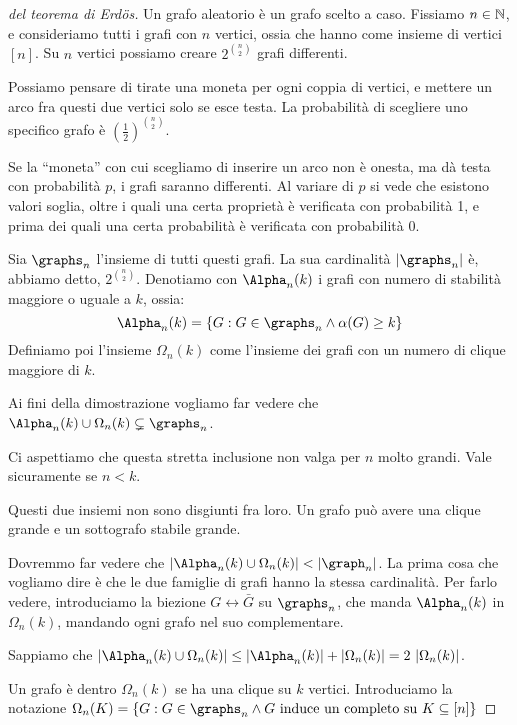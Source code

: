 	\begin{proof}[del teorema di Erd\"os]
		Un grafo aleatorio \`e un grafo scelto a caso.
		Fissiamo $n \in \mathbb{N}$, e consideriamo tutti i grafi con $n$ vertici, ossia che hanno come insieme di vertici $[n]$.
		Su $n$ vertici possiamo creare $2^{\binom{n}{2}}$ grafi differenti.

		Possiamo pensare di tirate una moneta per ogni coppia di vertici, e mettere un arco fra questi due vertici solo se esce testa.
		La probabilit\`a di scegliere uno specifico grafo \`e ${\left( \frac{1}{2} \right)}^{\binom{n}{2}}$.

		Se la ``moneta'' con cui scegliamo di inserire un arco non \`e onesta, ma d\`a testa con probabilit\`a $p$, i grafi saranno differenti.
		Al variare di $p$ si vede che esistono valori soglia, oltre i quali una certa propriet\`a \`e verificata con probabilit\`a 1, e prima dei quali una certa probabilit\`a \`e verificata con probabilit\`a 0.

		Sia $\graphs_n$ l'insieme di tutti questi grafi.
		La sua cardinalit\`a $\abs{\graphs_n}$ \`e, abbiamo detto, $2^{\binom{n}{2}}$.
		Denotiamo con $\Alpha_n(k)$ i grafi con numero di stabilit\`a maggiore o uguale a $k$, ossia:
		\[
			\Alpha_n(k) = \{ G : G \in \graphs_n \land \alpha(G) \ge k \}
		\]
		Definiamo poi l'insieme $\Omega_n (k)$ come l'insieme dei grafi con un numero di clique maggiore di $k$.

		Ai fini della dimostrazione vogliamo far vedere che $\Alpha_n (k) \cup \Omega_n (k) \subsetneq \graphs_n$.

		Ci aspettiamo che questa stretta inclusione non valga per $n$ molto grandi.
		Vale sicuramente se $n < k$. %

		Questi due insiemi non sono disgiunti fra loro.
		Un grafo pu\`o avere una clique grande e un sottografo stabile grande.

		Dovremmo far vedere che $\abs{\Alpha_n (k) \cup \Omega_n (k)} < \abs{\graph_n}$.
		La prima cosa che vogliamo dire \`e che le due famiglie di grafi hanno la stessa cardinalit\`a.
		Per farlo vedere, introduciamo la biezione $G \leftrightarrow \bar{G}$ su $\graphs_n$, che manda $\Alpha_n (k)$ in $\Omega_n (k)$, mandando ogni grafo nel suo complementare.

		Sappiamo che $\abs{\Alpha_n (k) \cup \Omega_n (k)} \le \abs{\Alpha_n (k)} + \abs{\Omega_n (k)} = 2 \, \abs{\Omega_n (k)}$.

		Un grafo \`e dentro $\Omega_n (k)$ se ha una clique su $k$ vertici.
		Introduciamo la notazione $\Omega_n (K) = \{ G : G \in \graphs_n \land G \text{ induce un completo su } K \subseteq [n] \}$


\end{proof}
